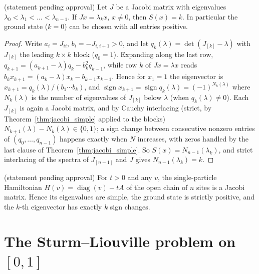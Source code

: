 \begin{theorem}
  \label{thm:jacobi_oscillation}
  (statement pending approval)
  Let $J$ be a Jacobi matrix with eigenvalues $\lambda_0<\lambda_1<\dots<\lambda_{n-1}$. If $Jx=\lambda_kx$, $x\ne0$, then
  $S(x)=k$. In particular the ground state ($k=0$) can be chosen with all entries positive.
\end{theorem}
\begin{proof}
  Write $a_i=J_{ii}$, $b_i=-J_{i,i+1}>0$, and let $q_k(\lambda)=\det(J_{[k]}-\lambda)$ with $J_{[k]}$ the leading
  $k\times k$ block ($q_0=1$). Expanding along the last row, $q_{k+1}=(a_{k+1}-\lambda)q_k-b_k^2q_{k-1}$, while row $k$
  of $Jx=\lambda x$ reads $b_kx_{k+1}=(a_k-\lambda)x_k-b_{k-1}x_{k-1}$. Hence for $x_1=1$ the eigenvector is
  $x_{k+1}=q_k(\lambda)/(b_1\cdots b_k)$, and $\operatorname{sign}x_{k+1}=\operatorname{sign}q_k(\lambda)
  =(-1)^{N_k(\lambda)}$ where $N_k(\lambda)$ is the number of eigenvalues of $J_{[k]}$ below $\lambda$ (when $q_k(\lambda)\ne0$).
  Each $J_{[k]}$ is again a Jacobi matrix, and by Cauchy interlacing (strict, by Theorem~\ref{thm:jacobi_simple} applied
  to the blocks) $N_{k+1}(\lambda)-N_k(\lambda)\in\{0,1\}$; a sign change between consecutive nonzero entries of
  $(q_0,\dots,q_{n-1})$ happens exactly when $N$ increases, with zeros handled by the last clause of
  Theorem~\ref{thm:jacobi_simple}. So $S(x)=N_{n-1}(\lambda_k)$, and strict interlacing of the spectra of $J_{[n-1]}$ and
  $J$ gives $N_{n-1}(\lambda_k)=k$.
\end{proof}

\begin{corollary}
  \label{cor:chain_nodes}
  (statement pending approval)
  For $t>0$ and any $v$, the single-particle Hamiltonian $H(v)=\operatorname{diag}(v)-tA$ of the open chain of $n$ sites
  is a Jacobi matrix. Hence its eigenvalues are simple, the ground state is strictly positive, and the $k$-th
  eigenvector has exactly $k$ sign changes.
\end{corollary}

\section{The Sturm--Liouville problem on $[0,1]$}

